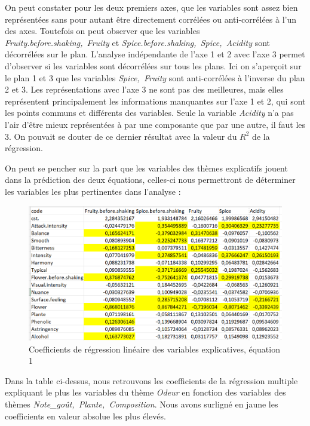 \documentclass[a4paper,french,10pt]{article}
\begin{document}
\newpage
On peut constater pour les deux premiers axes, que les variables sont assez bien représentées sans pour autant être directement corrélées ou anti-corrélées à l'un des axes. Toutefois on peut observer que les variables \textit{Fruity.before.shaking,~Fruity} et \textit{Spice.before.shaking,~Spice,~Acidity} sont décorrélées sur le plan. L'analyse indépendante de l'axe 1 et 2 avec l'axe 3 permet d'observer si les variables sont décorrélées sur tous les plans. Ici on s'aperçoit sur le plan 1 et 3 que les variables \textit{Spice,~Fruity} sont anti-corrélées à l'inverse du plan 2 et 3. Les représentations avec l'axe 3 ne sont pas des meilleures, mais elles représentent principalement les informations manquantes sur l'axe 1 et 2, qui sont les points communs et différents des variables. Seule la variable \textit{Acidity} n'a pas l'air d'être mieux représentées à par une composante que par une autre, il faut les 3. On pouvait se douter de ce dernier résultat avec la valeur du $R^2$ de la régression.\newline

On peut se pencher sur la part que les variables des thèmes explicatifs jouent dans la prédiction des deux équations, celles-ci nous permettront de déterminer les variables les plus pertinentes dans l'analyse : 

\begin{figure}[htp] 
	\centering
	\includegraphics[scale=0.45]{images/Coeff_var_Eq1.png}
	\caption{Coefficients de régression linéaire des variables explicatives, équation 1}
\end{figure}

Dans la table ci-dessus, nous retrouvons les coefficients de la régression multiple expliquant le plus les variables du thème \textit{Odeur} en fonction des variables des thèmes \textit{Note\_goût,~Plante,~Composition}.
Nous avons surligné en jaune les coefficients en valeur absolue les plus élevés.
\end{document}

